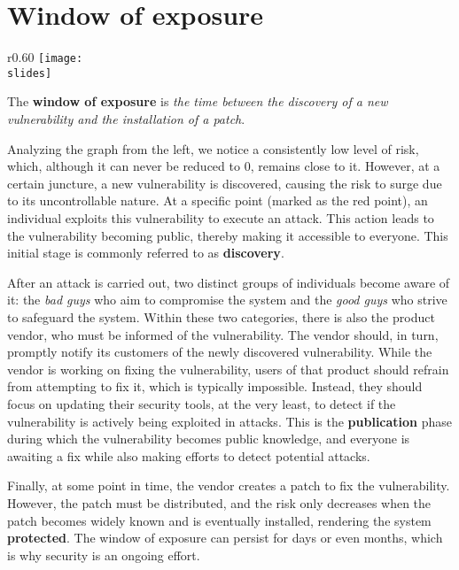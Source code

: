 \newpage
\section{Window of exposure}
\begin{wrapfigure}{r}{0.60\textwidth}
  \centering
  \texttt{[image: \\slides]}
\end{wrapfigure}
The \textbf{window of exposure} is \emph{the time between the discovery of a new vulnerability and the installation of a patch}.


Analyzing the graph from the left, we notice a consistently low level of risk, which, although it can never be reduced to 0, remains close to it.
However, at a certain juncture, a new vulnerability is discovered, causing the risk to surge due to its uncontrollable nature.
At a specific point (marked as the red point), an individual exploits this vulnerability to execute an attack. This action leads to the vulnerability becoming public, thereby making it accessible to everyone.
This initial stage is commonly referred to as \textbf{discovery}.

After an attack is carried out, two distinct groups of individuals become aware of it: the \emph{bad guys} who aim to compromise the system and the \emph{good guys} who strive to safeguard the system. Within these two categories, there is also the product vendor, who must be informed of the vulnerability. The vendor should, in turn, promptly notify its customers of the newly discovered vulnerability. While the vendor is working on fixing the vulnerability, users of that product should refrain from attempting to fix it, which is typically impossible. Instead, they should focus on updating their security tools, at the very least, to detect if the vulnerability is actively being exploited in attacks. This is the \textbf{publication} phase during which the vulnerability becomes public knowledge, and everyone is awaiting a fix while also making efforts to detect potential attacks.

Finally, at some point in time, the vendor creates a patch to fix the vulnerability. However, the patch must be distributed, and the risk only decreases when the patch becomes widely known and is eventually installed, rendering the system \textbf{protected}. The window of exposure can persist for days or even months, which is why security is an ongoing effort.

